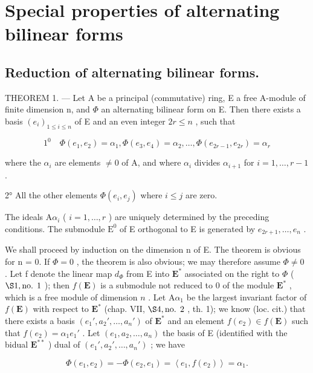 \section{Special properties of alternating bilinear forms}

\subsection{Reduction of alternating bilinear forms.}

THEOREM 1. --- Let A be a principal (commutative) ring, E a free A-module of finite dimension n, and \(\Phi\) an alternating bilinear form on E. Then there exists a basis \((e_i)_{1 \leqslant i \leqslant n}\) of E and an even integer \(2r \leqslant n\) , such that

\[
1 ^ {0} \quad \Phi (e _ {1}, e _ {2}) = \alpha_ {1}, \Phi (e _ {3}, e _ {4}) = \alpha_ {2}, \dots , \Phi (e _ {2 r - 1}, e _ {2 r}) = \alpha_ {r}
\]

where the \(\alpha_{i}\) are elements \(\neq 0\) of A, and where \(\alpha_{i}\) divides \(\alpha_{i+1}\) for \(i=1,\ldots,r-1\) .

2° All the other elements \(\Phi(e_{i}, e_{j})\) where \(i \leqslant j\) are zero.

The ideals \(\mathrm{A}\alpha_{i}\) ( \(i=1,\ldots,r\) ) are uniquely determined by the preceding conditions. The submodule \(\mathrm{E}^{0}\) of E orthogonal to E is generated by \(e_{2r+1},\ldots,e_{n}\) .

We shall proceed by induction on the dimension n of E. The theorem is obvious for n = 0. If \(\Phi = 0\) , the theorem is also obvious; we may therefore assume \(\Phi \neq 0\) . Let f denote the linear map \(d_{\Phi}\) from E into \(\mathbf{E}^*\) associated on the right to \(\Phi\) ( \(\S 1, \text{no. 1}\) ); then \(f(\mathbf{E})\) is a submodule not reduced to 0 of the module \(\mathbf{E}^*\) , which is a free module of dimension \(n\) . Let \(\mathrm{A}\alpha_{1}\) be the largest invariant factor of \(f(\mathbf{E})\) with respect to \(\mathbf{E}^*\) (chap. VII, \(\S 4, \text{no. 2}\) , th. 1); we know (loc. cit.) that there exists a basis \((e_{1}', a_{2}', \ldots, a_{n}')\) of \(\mathbf{E}^*\) and an element \(f(e_{2}) \in f(\mathbf{E})\) such that \(f(e_{2}) = \alpha_{1}e_{1}'\) . Let \((e_{1}, a_{2}, \ldots, a_{n})\) the basis of E (identified with the bidual \(\mathbf{E}^{**}\) ) dual of \((e_{1}', a_{2}', \ldots, a_{n}')\) ; we have

\[
\Phi (e _ {1}, e _ {2}) = - \Phi (e _ {2}, e _ {1}) = \left\langle e _ {1}, f (e _ {2}) \right\rangle = \alpha_ {1}.\tag{1}
\]

